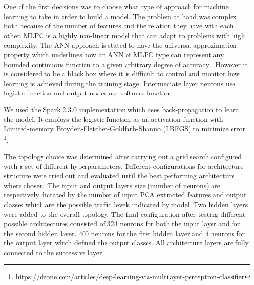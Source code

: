 \documentclass[12pt, a4paper]{report}
\theoremstyle{definition}
\theoremstyle{definition}%
\theoremstyle{definition}%
\theoremstyle{definition}%
\theoremstyle{definition}%
\theoremstyle{definition}%
\begin{document}
One of the first decisions was to choose what type of approach for machine learning to take in order to build a model. The problem at hand was complex both because of the number of features and the relation they have with each other. MLPC is a highly non-linear model that can adapt to problems with high complexity. The ANN approach is stated to have the universal approximation property which underlines how an ANN of MLPC type can represent any bounded continuous function to a given arbitrary degree of accuracy \cite{hornik1990universal}. However it is considered to be a black box where it is difficult to control and monitor how learning is achieved during the training stage. Intermediate layer neurons use logistic function and output nodes use softmax function.

We used the Spark 2.3.0 implementation which uses back-propagation to learn the model. It employs the logistic function as an activation function with Limited-memory Broyden-Fletcher-Goldfarb-Shanno (LBFGS) to minimize error \footnote{https://dzone.com/articles/deep-learning-via-multilayer-perceptron-classifier}.  


The topology choice was determined after carrying out a grid search configured with a set of different hyperparameters. Different configurations for architecture structure were tried out and evaluated until the best performing architecture where chosen. The input and output layers size (number of neurons) are respectively dictated by the number of input PCA extracted features and output classes which are the possible traffic levels indicated by model. Two hidden layers were added to the overall topology. The final configuration after testing different possible architectures consisted of 324 neurons for both the input layer and for the second hidden layer, 400 neurons for the first hidden layer and 4 neurons for the output layer which defined the output classes. All architecture layers are fully connected to the successive layer. 
\end{document}
